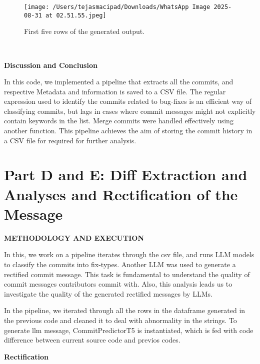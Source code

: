 \documentclass[12pt, a4paper]{report}
\newcommand{\sectionbar}[1]{%
  \vspace{0.6\baselineskip}%
  \noindent
  \colorbox{sectionbar}{%
    \parbox{\dimexpr\linewidth-2\fboxsep\relax}{%
      \textbf{\Large\textsf{#1}}%
    }%
  }%
  \vspace{0.6\baselineskip}
}
\begin{document}
\begin{figure}[h!]
    \centering
    \texttt{[image: /Users/tejasmacipad/Downloads/WhatsApp Image 2025-08-31 at 02.51.55.jpeg]}
    \caption{First five rows of the generated output.}
\end{figure}

\
\sectionbar{Discussion and Conclusion}
In this code, we implemented a pipeline that extracts all the commits, and respective Metadata and information is saved to a CSV file. 
The regular expression used to identify the commits related to bug-fixes is an efficient way of classifying commits, but lags in cases where commit messages might not explicitly contain keywords in the list.
Merge commits were handled effectively using another function. This pipeline achieves the aim of storing the commit history in a CSV file for required for further analysis.

\cleardoublepage

\section{Part D and E: Diff Extraction and Analyses and Rectification of the Message}
\sectionbar{METHODOLOGY AND EXECUTION}

In this, we work on a pipeline iterates through the csv file, and runs LLM models to classify the commits into fix-types. Another LLM was used to generate a rectified commit message.
This task is fundamental to understand the quality of commit messages contributors commit with. Also, this analysis leads us to investigate the quality of the generated rectified messages by LLMs.

In the pipeline, we iterated through all the rows in the dataframe generated in the previous code and cleaned it to deal with abnormality in the strings.
\newline
To generate llm message, CommitPredictorT5 is instantiated, which is fed with code difference between current source code and previos codes.

\textbf{Rectification}
\end{document}
